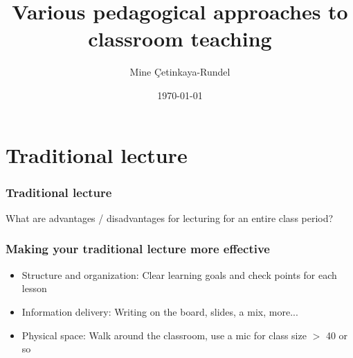 \documentclass{beamer}
\title{Various pedagogical approaches to classroom teaching}
\date{\today}
\author{Mine \c{C}etinkaya-Rundel}
\institute{Sta 771S - Teaching Statistics}
\begin{document}
\maketitle
 
 

\section{Traditional lecture}


\begin{frame}
\frametitle{Traditional lecture}

\vfill

What are advantages / disadvantages for lecturing for an entire class period?

\vfill

\end{frame}


\begin{frame}
\frametitle{Making your traditional lecture more effective}

\begin{itemize}

\item Structure and organization: Clear learning goals and check points for each lesson

\item Information delivery: Writing on the board, slides, a mix, more...

\item Physical space: Walk around the classroom, use a mic for class size $>$ 40 or so

\end{itemize}

\end{frame}

\end{document}
